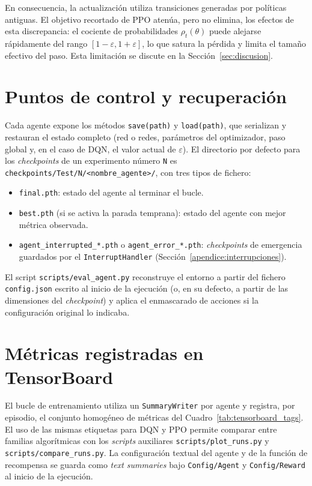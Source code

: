 En consecuencia, la actualización utiliza transiciones generadas por
políticas antiguas. El objetivo recortado de PPO atenúa, pero no
elimina, los efectos de esta discrepancia: el cociente de
probabilidades $\rho_t(\theta)$ puede alejarse rápidamente del rango
$[1-\varepsilon, 1+\varepsilon]$, lo que satura la pérdida y limita el
tamaño efectivo del paso. Esta limitación se discute en la
Sección~\ref{sec:discusion}.

\section{Puntos de control y recuperación}\label{apendice:checkpoints}
Cada agente expone los métodos \texttt{save(path)} y
\texttt{load(path)}, que serializan y restauran el estado completo
(red o redes, parámetros del optimizador, paso global y, en el caso
de DQN, el valor actual de $\varepsilon$). El directorio por defecto
para los \textit{checkpoints} de un experimento número \texttt{N} es
\texttt{checkpoints/Test/N/<nombre\_agente>/}, con tres tipos de
fichero:

\begin{itemize}
    \item \texttt{final.pth}: estado del agente al terminar el bucle.
    \item \texttt{best.pth} (si se activa la parada temprana): estado
    del agente con mejor métrica observada.
    \item \texttt{agent\_interrupted\_*.pth} o
    \texttt{agent\_error\_*.pth}: \textit{checkpoints} de emergencia
    guardados por el \texttt{InterruptHandler}
    (Sección~\ref{apendice:interrupciones}).
\end{itemize}

El script \texttt{scripts/eval\_agent.py} reconstruye el entorno a
partir del fichero \texttt{config.json} escrito al inicio de la
ejecución (o, en su defecto, a partir de las dimensiones del
\textit{checkpoint}) y aplica el enmascarado de acciones si la
configuración original lo indicaba.

\section{Métricas registradas en TensorBoard}\label{apendice:tensorboard}
El bucle de entrenamiento utiliza un \texttt{SummaryWriter} por agente
y registra, por episodio, el conjunto homogéneo de métricas del
Cuadro~\ref{tab:tensorboard_tags}. El uso de las mismas etiquetas para
DQN y PPO permite comparar entre familias algorítmicas con los
\textit{scripts} auxiliares \texttt{scripts/plot\_runs.py} y
\texttt{scripts/compare\_runs.py}. La configuración textual del agente
y de la función de recompensa se guarda como \textit{text summaries}
bajo \texttt{Config/Agent} y \texttt{Config/Reward} al inicio de la
ejecución.

